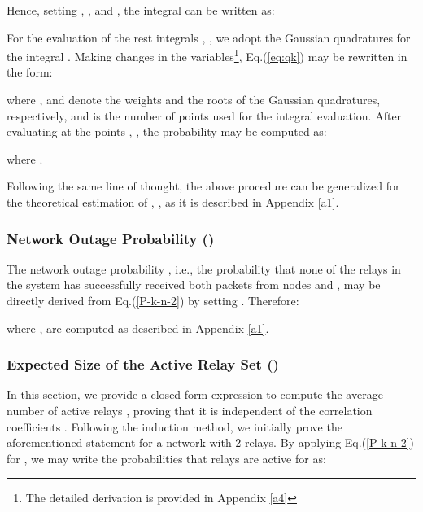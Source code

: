 \documentclass[12pt,draftcls, onecolumn]{IEEEtran}
\begin{document}
\endgroup
Hence, setting , ,  and , the integral  can be written as:

\begingroup


\endgroup


For the evaluation of the rest integrals , , we adopt the Gaussian quadratures for the integral  \cite[Table II, N=15]{1969method}. Making changes in the variables\footnote{The detailed derivation is provided in Appendix \ref{a4}}, Eq.(\ref{eq:qk}) may be rewritten in the form:

\begingroup

\endgroup

\noindent where ,  and  denote the weights and the roots of the Gaussian quadratures\cite{1969method}, respectively, and  is the number of points used for the integral evaluation. After evaluating  at the points , , the probability  may be computed as:

\begingroup

\endgroup

\noindent where .

Following the same line of thought, the above procedure can be generalized for the theoretical estimation of ,   , as it is described in Appendix \ref{a1}.

\subsubsection{Network Outage Probability ()}

The network outage probability , i.e., the probability that none of the relays in the system has successfully received both packets from nodes  and , may be directly derived from Eq.(\ref{P-k-n-2}) by setting . Therefore:

\begingroup
\small

\endgroup

\noindent where ,  are computed as described in Appendix \ref{a1}.   


\vspace{-1pt}

\subsubsection{Expected Size of the Active Relay Set ()}
\label{subsec}

In this section, we provide a closed-form expression to compute the average number of active relays , proving that it is independent of the correlation coefficients . Following the induction method, we initially prove the aforementioned statement for a network with 2 relays. By applying Eq.(\ref{P-k-n-2}) for , we may write the probabilities that  relays are active for  as:
\end{document}
